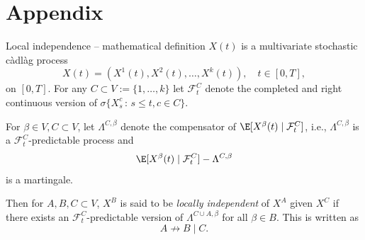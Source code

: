 \documentclass{beamer}\usepackage{listings}
\begin{document}
\section{Appendix}
\label{sec:orga08375f}
\appendix
\begin{frame}[label={sec:orge0838e7}]{Local independence -- mathematical definition}
$X(t)$ is a multivariate stochastic càdlàg process
\begin{equation*}
  X(t) = (X^1(t), X^2(t), \dots, X^k(t)), \quad t \in [0, T], 
\end{equation*}
on $[0,T]$. For any $C \subset V := \{1, \dots, k\}$ let $\mathcal{F}^C_t$ denote the completed and
right continuous version of $\sigma \{ X_s^c \, : \, s \leq t, c \in C\}$.

\vfill

For $\beta \in V, C \subset V$, let $\Lambda^{C, \beta}$ denote the compensator of
$\E[ X^{\beta}(t) \mid \mathcal{F}_t^C]$, i.e., $\Lambda^{C, \beta}$ is a
$\mathcal{F}_t^C$-predictable process and
\begin{equation*}
  \E[X^{\beta}(t) \mid \mathcal{F}_t^C] - \Lambda^{C, \beta}
\end{equation*}
is a martingale.

\vfill

Then for $A, B, C \subset V$, $X^B$ is said to be \textit{locally independent} of $X^A$ given $X^C$
if there exists an $\mathcal{F}_t^C$-predictable version of $\Lambda^{C \cup A, \beta}$ for all
$\beta \in B$. This is written as
\begin{equation*}
  A \not \rightarrow B \mid C.
\end{equation*}
\end{frame}
\end{document}
